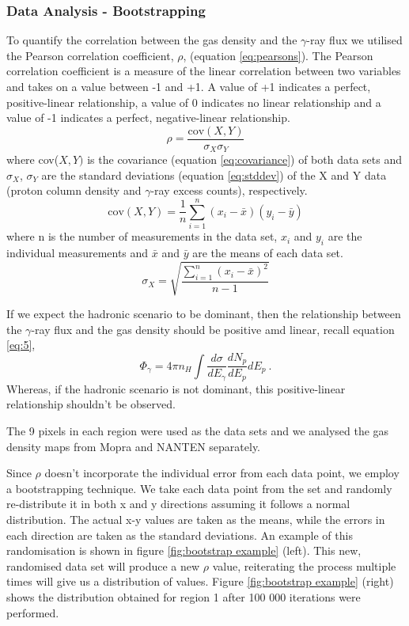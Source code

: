 \documentclass[12pt,a4paper]{article}
\begin{document}
\subsubsection{Data Analysis - Bootstrapping}
To quantify the correlation between the gas density and the $\gamma$-ray flux we utilised the Pearson correlation coefficient, $\rho$, (equation \ref{eq:pearsons}). The Pearson correlation coefficient is a measure of the linear correlation between two variables and takes on a value between -1 and +1. A value of +1 indicates a perfect, positive-linear relationship, a value of 0 indicates no linear relationship and a value of -1 indicates a perfect, negative-linear relationship. 
\begin{equation}\label{eq:pearsons}
\rho = \dfrac{\mathrm{cov}(X,Y)}{\sigma_X \sigma_Y}
\end{equation}
where cov($X,Y)$ is the covariance (equation \ref{eq:covariance}) of both data sets and $\sigma_X$, $\sigma_Y$ are the standard deviations (equation \ref{eq:stddev}) of the X and Y data (proton column density and $\gamma$-ray excess counts), respectively.
\begin{equation}\label{eq:covariance}
\mathrm{cov}(X,Y) = \dfrac{1}{n} \sum_{i=1}^n (x_i - \bar{x})(y_i - \bar{y})
\end{equation}
where n is the number of measurements in the data set, $x_i$ and $y_i$ are the individual measurements and $\bar{x}$ and $\bar{y}$ are the means of each data set.
\begin{equation}\label{eq:stddev}
\sigma_X = \sqrt{\dfrac{\sum_{i=1}^n (x_i - \bar{x})^2}{n -1}}
\end{equation}

If we expect the hadronic scenario to be dominant, then the relationship between the $\gamma$-ray flux and the gas density should be positive amd linear, recall equation \ref{eq:5},
\begin{equation} 
\Phi_{\gamma} = 4 \pi n_H \int \dfrac{d\sigma}{dE_\gamma} \dfrac{dN_p}{dE_p} dE_p \ .
\end{equation}
Whereas, if the hadronic scenario is not dominant, this positive-linear relationship shouldn't be observed. 

The 9 pixels in each region were used as the data sets and we analysed the gas density maps from Mopra and NANTEN separately. 

Since $\rho$ doesn't incorporate the individual error from each data point, we employ a bootstrapping technique. 
We take each data point from the set and randomly re-distribute it in both x and y directions assuming it follows a normal distribution. 
The actual x-y values are taken as the means, while the errors in each direction are taken as the standard deviations. 
An example of this randomisation is shown in figure \ref{fig:bootstrap example} (left). 
This new, randomised data set will produce a new $\rho$ value, reiterating the process multiple times will give us a distribution of values. 
Figure \ref{fig:bootstrap example} (right) shows the distribution obtained for region 1 after 100 000 iterations were performed. 
\end{document}
